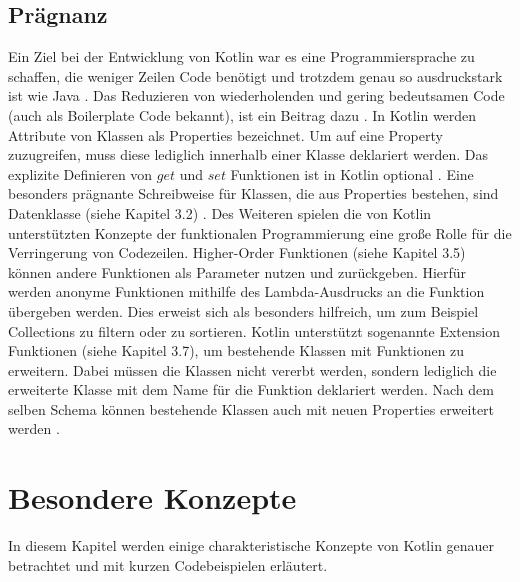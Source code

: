 \documentclass{article}
\begin{document}
\subsection{Prägnanz}
Ein Ziel bei der Entwicklung von Kotlin war es eine Programmiersprache zu schaffen, die weniger Zeilen Code benötigt und trotzdem genau so ausdruckstark ist wie Java \cite{Kotlin_In-D}. Das Reduzieren von wiederholenden und gering bedeutsamen Code (auch als Boilerplate Code bekannt), ist ein Beitrag dazu \cite{KotlinLangDoc}. In Kotlin werden Attribute von Klassen als Properties bezeichnet. Um auf eine Property zuzugreifen, muss diese lediglich innerhalb einer Klasse deklariert werden. Das explizite Definieren von $get$ und $set$ Funktionen ist in Kotlin optional \cite{KotlinLangDoc}. Eine besonders prägnante Schreibweise für Klassen, die aus Properties bestehen, sind Datenklasse (siehe Kapitel 3.2) \cite{KotlinLangDoc}.
Des Weiteren spielen die von Kotlin unterstützten Konzepte der funktionalen Programmierung eine große Rolle für die Verringerung von Codezeilen. Higher-Order Funktionen (siehe Kapitel 3.5) können andere Funktionen als Parameter nutzen und zurückgeben\cite{KotlinLangDoc}. Hierfür werden anonyme Funktionen mithilfe des Lambda-Ausdrucks an die Funktion übergeben werden. Dies erweist sich als besonders hilfreich, um zum Beispiel Collections zu filtern oder zu sortieren. \newline
Kotlin unterstützt sogenannte Extension Funktionen (siehe Kapitel 3.7), um bestehende Klassen mit Funktionen zu erweitern. Dabei müssen die Klassen nicht vererbt werden, sondern lediglich die erweiterte Klasse mit dem Name für die Funktion deklariert werden. Nach dem selben Schema können bestehende Klassen auch mit neuen Properties erweitert werden \cite{KotlinLangDoc}.

\section{Besondere Konzepte}
In diesem Kapitel werden einige charakteristische Konzepte von Kotlin genauer betrachtet und mit kurzen Codebeispielen erläutert.
\end{document}

